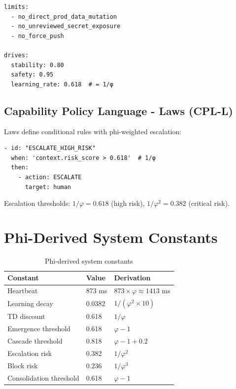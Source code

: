 \documentclass[11pt,a4paper]{article}
\begin{document}
\begin{verbatim}
limits:
  - no_direct_prod_data_mutation
  - no_unreviewed_secret_exposure
  - no_force_push

drives:
  stability: 0.80
  safety: 0.95
  learning_rate: 0.618  # = 1/φ
\end{verbatim}

\subsection{Capability Policy Language - Laws (CPL-L)}

Laws define conditional rules with phi-weighted escalation:

\begin{verbatim}
- id: "ESCALATE_HIGH_RISK"
  when: 'context.risk_score > 0.618'  # 1/φ
  then:
    - action: ESCALATE
      target: human
\end{verbatim}

Escalation thresholds: $1/\varphi = 0.618$ (high risk), 
$1/\varphi^2 = 0.382$ (critical risk).


\section{Phi-Derived System Constants}

\begin{table}[h]
\centering
\begin{tabular}{lll}
\toprule
Constant & Value & Derivation \\
\midrule
Heartbeat & 873 ms & $873 \times \varphi \approx 1413$ ms \\
Learning decay & 0.0382 & $1/(\varphi^2 \times 10)$ \\
TD discount & 0.618 & $1/\varphi$ \\
Emergence threshold & 0.618 & $\varphi - 1$ \\
Cascade threshold & 0.818 & $\varphi - 1 + 0.2$ \\
Escalation risk & 0.382 & $1/\varphi^2$ \\
Block risk & 0.236 & $1/\varphi^3$ \\
Consolidation threshold & 0.618 & $\varphi - 1$ \\
\bottomrule
\end{tabular}
\caption{Phi-derived system constants}
\end{table}
\end{document}
